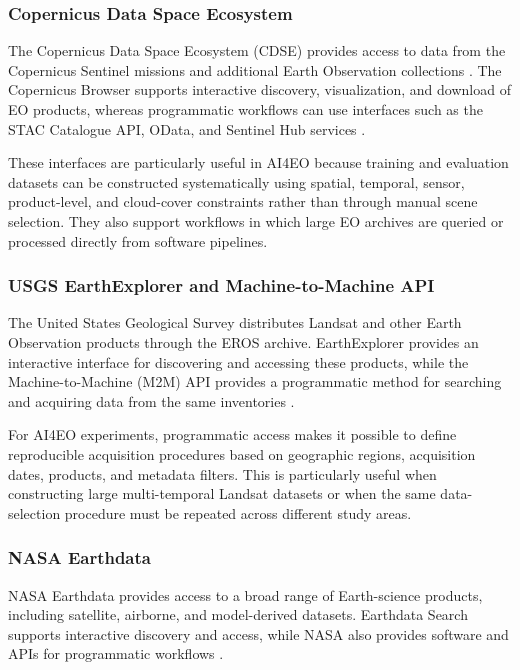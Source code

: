 \documentclass[11pt,a4paper]{article}
\begin{document}
\subsubsection{Copernicus Data Space Ecosystem}

The Copernicus Data Space Ecosystem (CDSE) provides access to data from
the Copernicus Sentinel missions and additional Earth Observation
collections \cite{cdse_documentation}. The Copernicus Browser supports
interactive discovery, visualization, and download of EO products,
whereas programmatic workflows can use interfaces such as the STAC
Catalogue API, OData, and Sentinel Hub services
\cite{cdse_apis,cdse_browser}.

These interfaces are particularly useful in AI4EO because training and
evaluation datasets can be constructed systematically using spatial,
temporal, sensor, product-level, and cloud-cover constraints rather than
through manual scene selection. They also support workflows in which
large EO archives are queried or processed directly from software
pipelines.

\subsubsection{USGS EarthExplorer and Machine-to-Machine API}

The United States Geological Survey distributes Landsat and other Earth
Observation products through the EROS archive. EarthExplorer provides an
interactive interface for discovering and accessing these products,
while the Machine-to-Machine (M2M) API provides a programmatic method for
searching and acquiring data from the same inventories
\cite{usgs_m2m}.

For AI4EO experiments, programmatic access makes it possible to define
reproducible acquisition procedures based on geographic regions,
acquisition dates, products, and metadata filters. This is particularly
useful when constructing large multi-temporal Landsat datasets or when
the same data-selection procedure must be repeated across different
study areas.

\subsubsection{NASA Earthdata}

NASA Earthdata provides access to a broad range of Earth-science
products, including satellite, airborne, and model-derived datasets.
Earthdata Search supports interactive discovery and access, while NASA
also provides software and APIs for programmatic workflows
\cite{nasa_earthdata_search}.
\end{document}
